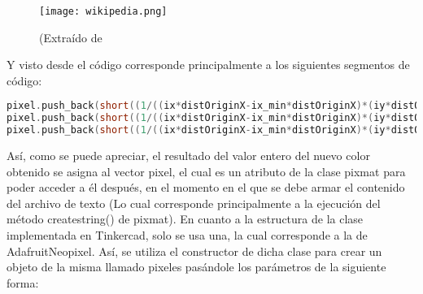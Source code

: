 \documentclass{article}
\begin{document}
\begin{figure}
    \centering
    \texttt{[image: wikipedia.png]}
    \caption{(Extraído de \cite{Wiki_InterpolacionBil}}
    \label{fig:wiki_interpolacionbil}
\end{figure}
Y visto desde el código corresponde principalmente a los siguientes segmentos de código:
\begin{lstlisting}[language=C++, label=code_interpolacionbilineal_part2]
pixel.push_back(short((1/((ix*distOriginX-ix_min*distOriginX)*(iy*distOriginY-iy_min*distOriginY)))*((image_dir.pixelColor(ix_min,iy_min).red()*(ix*distOriginX-(x*dist+dist/2))*(iy*distOriginY-(y*dist+dist/2)))+(image_dir.pixelColor(ix,iy_min).red()*((x*dist+dist/2)-ix_min*distOriginX)*(iy*distOriginY-(y*dist+dist/2)))+(image_dir.pixelColor(ix_min,iy).red()*(ix*distOriginX-(x*dist+dist/2))*((y*dist+dist/2)-iy_min*distOriginY))+(image_dir.pixelColor(ix,iy).red()*((x*dist+dist/2)-ix_min*distOriginX)*((y*dist+dist/2)-iy_min*distOriginY)))));
pixel.push_back(short((1/((ix*distOriginX-ix_min*distOriginX)*(iy*distOriginY-iy_min*distOriginY)))*((image_dir.pixelColor(ix_min,iy_min).green()*(ix*distOriginX-(x*dist+dist/2))*(iy*distOriginY-(y*dist+dist/2)))+(image_dir.pixelColor(ix,iy_min).green()*((x*dist+dist/2)-ix_min*distOriginX)*(iy*distOriginY-(y*dist+dist/2)))+(image_dir.pixelColor(ix_min,iy).green()*(ix*distOriginX-(x*dist+dist/2))*((y*dist+dist/2)-iy_min*distOriginY))+(image_dir.pixelColor(ix,iy).green()*((x*dist+dist/2)-ix_min*distOriginX)*((y*dist+dist/2)-iy_min*distOriginY)))));
pixel.push_back(short((1/((ix*distOriginX-ix_min*distOriginX)*(iy*distOriginY-iy_min*distOriginY)))*((image_dir.pixelColor(ix_min,iy_min).blue()*(ix*distOriginX-(x*dist+dist/2))*(iy*distOriginY-(y*dist+dist/2)))+(image_dir.pixelColor(ix,iy_min).blue()*((x*dist+dist/2)-ix_min*distOriginX)*(iy*distOriginY-(y*dist+dist/2)))+(image_dir.pixelColor(ix_min,iy).blue()*(ix*distOriginX-(x*dist+dist/2))*((y*dist+dist/2)-iy_min*distOriginY))+(image_dir.pixelColor(ix,iy).blue()*((x*dist+dist/2)-ix_min*distOriginX)*((y*dist+dist/2)-iy_min*distOriginY)))));

\end{lstlisting}
Así, como se puede apreciar, el resultado del valor entero del nuevo color obtenido se asigna al vector pixel, el cual es un atributo de la clase pixmat para poder acceder a él después, en el momento en el que se debe armar el contenido del archivo de texto (Lo cual corresponde principalmente a la ejecución del método createstring() de pixmat).
En cuanto a la estructura de la clase implementada en Tinkercad, solo se usa una, la cual corresponde a la de AdafruitNeopixel. Así, se utiliza el constructor de dicha clase para crear un objeto de la misma llamado pixeles pasándole los parámetros de la siguiente forma:
\end{document}
